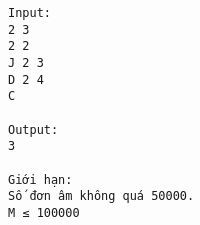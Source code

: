 \begin{verbatim}
Input:
2 3
2 2
J 2 3
D 2 4
C

Output:
3

Giới hạn:
Số đơn âm không quá 50000.
M ≤ 100000
\end{verbatim}